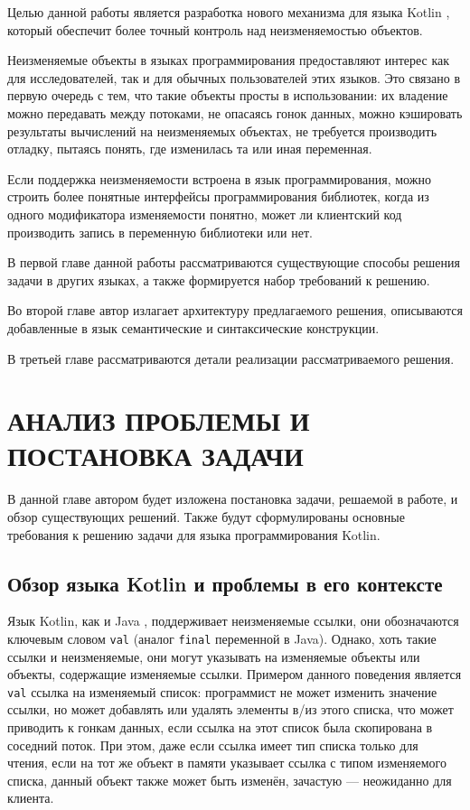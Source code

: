 \documentclass[specification,annotation,times]{itmo-student-thesis}
\begin{document}
Целью данной работы является разработка нового механизма для языка Kotlin \cite{kotlin}, который обеспечит более точный контроль над неизменяемостью объектов.

Неизменяемые объекты в языках программирования предоставляют интерес как для исследователей, так и для обычных пользователей этих языков.
Это связано в первую очередь с тем, что такие объекты просты в использовании: их
владение можно передавать между потоками, не опасаясь гонок данных, можно кэшировать результаты вычислений на неизменяемых объектах,
не требуется производить отладку, пытаясь понять, где изменилась та или иная переменная.

Если поддержка неизменяемости встроена в язык программирования, можно строить более понятные интерфейсы программирования библиотек,
когда из одного модификатора изменяемости понятно, может ли клиентский код производить запись в переменную библиотеки или нет.

В первой главе данной работы рассматриваются существующие способы решения задачи в других языках, а также формируется набор требований к решению.

Во второй главе автор излагает архитектуру предлагаемого решения, описываются добавленные в язык семантические и синтаксические конструкции.

В третьей главе рассматриваются детали реализации рассматриваемого решения.


\chapter{АНАЛИЗ ПРОБЛЕМЫ И ПОСТАНОВКА ЗАДАЧИ}

В данной главе автором будет изложена постановка задачи, решаемой в работе, и обзор существующих решений.
Также будут сформулированы основные требования к решению задачи для языка программирования Kotlin.

\section{Обзор языка Kotlin и проблемы в его контексте}\label{existing_kotlin}

Язык Kotlin, как и Java \cite{jvm8-spec}, поддерживает неизменяемые ссылки, они обозначаются ключевым словом \texttt{val} (аналог \texttt{final} переменной в Java). 
Однако, хоть такие ссылки и неизменяемые, они могут указывать на изменяемые объекты или объекты, содержащие изменяемые ссылки.
Примером данного поведения является \texttt{val} ссылка на изменяемый список: программист не может изменить значение ссылки, но может добавлять или удалять элементы в/из этого списка, что может приводить к гонкам данных, если ссылка на этот список была скопирована в соседний поток.
При этом, даже если ссылка имеет тип списка только для чтения, если на тот же объект в памяти указывает ссылка с типом изменяемого списка, данный объект также может быть изменён, зачастую --- неожиданно для клиента.
\end{document}
